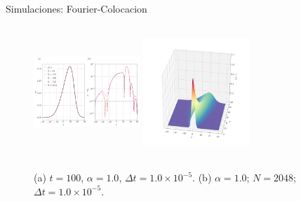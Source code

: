 \begin{frame}{Simulaciones: Fourier-Colocacion \hspace{2cm} \hyperlink{Navegador}{}}
	\begin{figure}
	    \centering
    	\includegraphics[height=5cm,width=4cm]{files/figures/viscid/collocation/Numerical_Solution_alpha=1_T=100.png}
        \qquad
	    \includegraphics[height=5cm,width=4cm]{files/figures/viscid/collocation/Numerical_Solution_alpha=1.png}
    	\caption{(a) $t = 100$, $\alpha = 1.0$, $\Delta t = 1.0 \times 10^{-5}$. (b) $\alpha = 1.0$; $N=2048$; $\Delta t = 1.0 \times 10^{-5}$.}
	\end{figure}
\end{frame}

